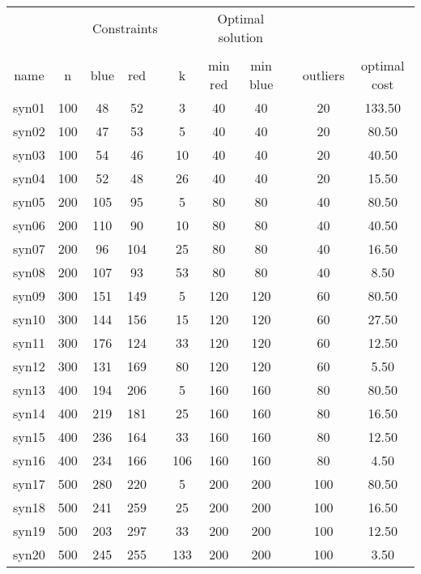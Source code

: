 \begin{table}[H]
    \centering
    \scriptsize
    \begin{tabular}{ccccccccccc}
        \firsthline
        \multicolumn{4}{c}{Graph Details} & & \multicolumn{3}{c}{Constraints} & & \multicolumn{2}{c}{Optimal solution}\\
        \cline{1-4} \cline{6-8} \cline{10-11}\\
         name &  n & blue & red & & k & min red & min blue & & outliers & optimal cost\\
         \hline
        syn01 & 100 & 48 & 52 & & 3 & 40 & 40 & & 20 & 133.50\\
        syn02 & 100 & 47 & 53 & & 5 & 40 & 40 & & 20 & 80.50\\
        syn03 & 100 & 54 & 46 & & 10 & 40 & 40 & & 20 & 40.50\\
        syn04 & 100 & 52 & 48 & & 26 & 40 & 40 & & 20 & 15.50\\
        syn05 & 200 & 105 & 95 & & 5 & 80 & 80 & & 40 & 80.50\\
        syn06 & 200 & 110 & 90 & & 10 & 80 & 80 & & 40 & 40.50\\
        syn07 & 200 & 96 & 104 & & 25 & 80 & 80 & & 40 & 16.50\\
        syn08 & 200 & 107 & 93 & & 53 & 80 & 80 & & 40 & 8.50\\
        syn09 & 300 & 151 & 149 & & 5 & 120 & 120 & & 60 & 80.50\\
        syn10 & 300 & 144 & 156 & & 15 & 120 & 120 & & 60 & 27.50\\
        syn11 & 300 & 176 & 124 & & 33 & 120 & 120 & & 60 & 12.50\\
        syn12 & 300 & 131 & 169 & & 80 & 120 & 120 & & 60 & 5.50\\
        syn13 & 400 & 194 & 206 & & 5 & 160 & 160 & & 80 & 80.50\\
        syn14 & 400 & 219 & 181 & & 25 & 160 & 160 & & 80 & 16.50\\
        syn15 & 400 & 236 & 164 & & 33 & 160 & 160 & & 80 & 12.50\\
        syn16 & 400 & 234 & 166 & & 106 & 160 & 160 & & 80 & 4.50\\
        syn17 & 500 & 280 & 220 & & 5 & 200 & 200 & & 100 & 80.50\\
        syn18 & 500 & 241 & 259 & & 25 & 200 & 200 & & 100 & 16.50\\
        syn19 & 500 & 203 & 297 & & 33 & 200 & 200 & & 100 & 12.50\\
        syn20 & 500 & 245 & 255 & & 133 & 200 & 200 & & 100 & 3.50\\

\end{tabular}
\end{table}
